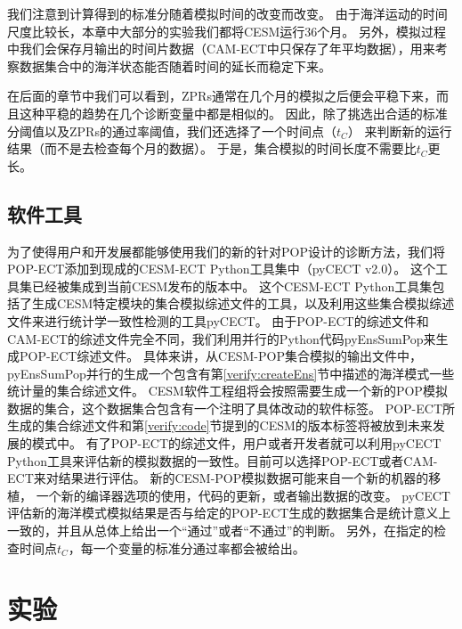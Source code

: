  
我们注意到计算得到的标准分随着模拟时间的改变而改变。 
由于海洋运动的时间尺度比较长，本章中大部分的实验我们都将CESM运行36个月。
另外，模拟过程中我们会保存月输出的时间片数据（CAM-ECT中只保存了年平均数据），用来考察数据集合中的海洋状态能否随着时间的延长而稳定下来。 



在后面的章节中我们可以看到，ZPRs通常在几个月的模拟之后便会平稳下来，而且这种平稳的趋势在几个诊断变量中都是相似的。 
因此，除了挑选出合适的标准分阈值以及ZPRs的通过率阈值，我们还选择了一个时间点（$t_C$）
来判断新的运行结果（而不是去检查每个月的数据）。 
于是，集合模拟的时间长度不需要比$t_C$更长。 

\subsection{软件工具}
\label{verify:ECTsoft}

为了使得用户和开发展都能够使用我们的新的针对POP设计的诊断方法，我们将POP-ECT添加到现成的CESM-ECT Python工具集中（pyCECT v2.0）。
这个工具集已经被集成到当前CESM发布的版本中。 
这个CESM-ECT Python工具集包括了生成CESM特定模块的集合模拟综述文件的工具，以及利用这些集合模拟综述文件来进行统计学一致性检测的工具pyCECT。
由于POP-ECT的综述文件和CAM-ECT的综述文件完全不同，我们利用并行的Python代码pyEnsSumPop来生成POP-ECT综述文件。
具体来讲，从CESM-POP集合模拟的输出文件中，pyEnsSumPop并行的生成一个包含有第\ref{verify:createEns}节中描述的海洋模式一些统计量的集合综述文件。 
CESM软件工程组将会按照需要生成一个新的POP模拟数据的集合，这个数据集合包含有一个注明了具体改动的软件标签。
POP-ECT所生成的集合综述文件和第\ref{verify:code}节提到的CESM的版本标签将被放到未来发展的模式中。 
有了POP-ECT的综述文件，用户或者开发者就可以利用pyCECT Python工具来评估新的模拟数据的一致性。目前可以选择POP-ECT或者CAM-ECT来对结果进行评估。
新的CESM-POP模拟数据可能来自一个新的机器的移植， 一个新的编译器选项的使用，代码的更新，或者输出数据的改变。
pyCECT评估新的海洋模式模拟结果是否与给定的POP-ECT生成的数据集合是统计意义上一致的，并且从总体上给出一个“通过”或者“不通过”的判断。
另外，在指定的检查时间点$t_C$，每一个变量的标准分通过率都会被给出。 

\section{实验} \label{verify:exp}

